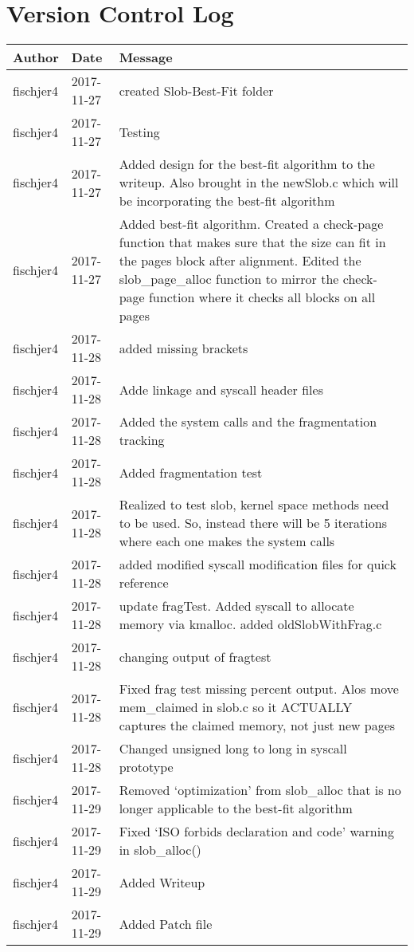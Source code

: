 \documentclass[draftclsnofoot, onecolumn, 10pt, compsoc]{IEEEtran}
\begin{document}
	\section{Version Control Log}
		\begin{center}
			\begin{longtabu} to \textwidth {|
					X[4,l]|
					X[3,c]|
					X[8,l]|}
				\hline
				\textbf{Author} & \textbf{Date} & \textbf{Message} \\ \hline
	
				fischjer4 & 2017-11-27 & created Slob-Best-Fit folder \\ \hline
				fischjer4 & 2017-11-27 & Testing \\ \hline
				fischjer4 & 2017-11-27 & Added design for the best-fit algorithm to the writeup. Also brought in the newSlob.c which will be incorporating the best-fit algorithm \\ \hline
				fischjer4 & 2017-11-27 & Added best-fit algorithm. Created a check-page function that makes sure that the size can fit in the pages block after alignment. Edited the slob\_page\_alloc function to mirror the check-page function where it checks all blocks on all pages \\ \hline
				fischjer4 & 2017-11-28 & added missing brackets \\ \hline
				fischjer4 & 2017-11-28 & Adde linkage and syscall header files \\ \hline
				fischjer4 & 2017-11-28 & Added the system calls and the fragmentation tracking \\ \hline
				fischjer4 & 2017-11-28 & Added fragmentation test \\ \hline
				fischjer4 & 2017-11-28 & Realized to test slob, kernel space methods need to be used. So, instead there will be 5 iterations where each one makes the system calls \\ \hline
				fischjer4 & 2017-11-28 & added modified syscall modification files for quick reference \\ \hline
				fischjer4 & 2017-11-28 & update fragTest. Added syscall to allocate memory via kmalloc. added oldSlobWithFrag.c \\ \hline
				fischjer4 & 2017-11-28 & changing output of fragtest \\ \hline
				fischjer4 & 2017-11-28 & Fixed frag test missing percent output. Alos move mem\_claimed in slob.c so it ACTUALLY captures the claimed memory, not just new pages \\ \hline
				fischjer4 & 2017-11-28 & Changed unsigned long to long in syscall prototype \\ \hline
				fischjer4 & 2017-11-29 & Removed `optimization' from slob\_alloc that is no longer applicable to the best-fit algorithm \\ \hline
				fischjer4 & 2017-11-29 & Fixed `ISO forbids declaration and code' warning in slob\_alloc() \\ \hline
				fischjer4 & 2017-11-29 & Added Writeup \\ \hline
				fischjer4 & 2017-11-29 & Added Patch file \\ \hline
				
			\end{longtabu}
		\end{center}
		
\end{document}
